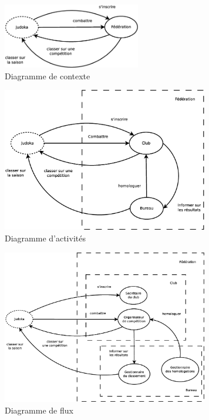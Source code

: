 \begin{figure}[!htb]
    \begin{center}
    \includegraphics[width=6cm]{images/cc2_df1.eps}
    \caption{\label{cc2_df1} Diagramme de contexte}
    \end{center}
\end{figure}

\begin{figure}[!htb]
    \begin{center}
    \includegraphics[width=9cm]{images/cc2_df2.eps}
    \caption{\label{cc2_df2} Diagramme d'activités}
    \end{center}
\end{figure}

\begin{figure}[!htb]
    \begin{center}
    \includegraphics[width=9cm]{images/cc2_df3.eps}
    \caption{\label{cc2_df3} Diagramme de flux}
    \end{center}
\end{figure}

